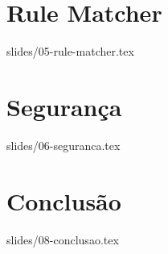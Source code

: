 \documentclass{beamer}
\begin{document}
\section{Rule Matcher}
{slides/05-rule-matcher.tex}

\section{Segurança}
{slides/06-seguranca.tex}


\section{Conclusão}
{slides/08-conclusao.tex}
\end{document}
